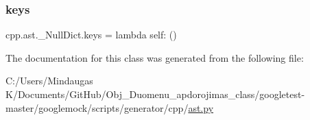 \mbox{\label{classcpp_1_1ast_1_1___null_dict_abb0b7884aa59bede0a8503dffcd1733f}} 
\subsubsection{\texorpdfstring{keys}{keys}}
{\footnotesize\ttfamily cpp.\+ast.\+\_\+\+Null\+Dict.\+keys = lambda self\+: ()\hspace{0.3cm}{\ttfamily [static]}}



The documentation for this class was generated from the following file\+:\begin{DoxyCompactItemize}
\item 
C\+:/\+Users/\+Mindaugas K/\+Documents/\+Git\+Hub/\+Obj\+\_\+\+Duomenu\+\_\+apdorojimas\+\_\+class/googletest-\/master/googlemock/scripts/generator/cpp/\mbox{\hyperlink{googletest-master_2googlemock_2scripts_2generator_2cpp_2ast_8py}{ast.\+py}}\end{DoxyCompactItemize}
